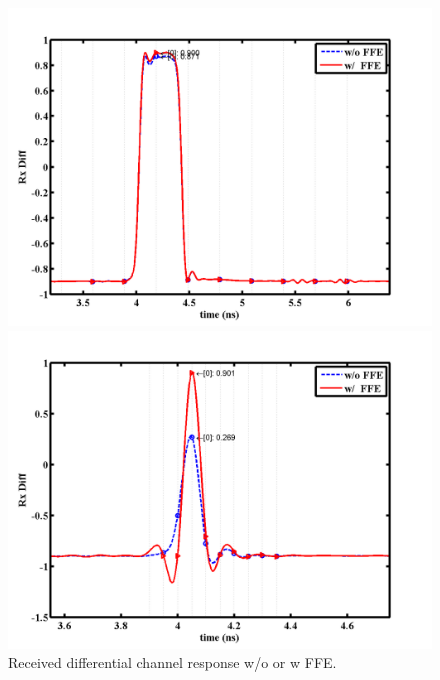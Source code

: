 \documentclass{book}  %
\begin{document}
\begin{paper}
	
\begin{figure}[htbp!]	
	\ContinuedFloat
	\begin{minipage}[tb]{0.5\textwidth}
		\centering	
		\includegraphics[width=\textwidth]{./img/Verilog/3G/2_diff.png}
	\end{minipage}%
	\begin{minipage}[tb]{0.5\textwidth}
		\centering	
		\includegraphics[width=\textwidth]{./img/Verilog/20G/2_diff.png}
	\end{minipage}%
	\caption{Received differential channel response w/o or w FFE.}
\end{figure}


\end{paper}
\end{document}
